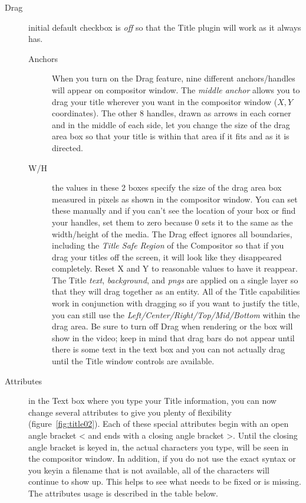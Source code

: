 \begin{description}
    \item[Drag] initial default checkbox is \textit{off} so that the Title plugin will work as it always has.
    \begin{description}
        \item[Anchors] When you turn on the Drag feature, nine different anchors/handles will appear on compositor window. The \textit{middle anchor} allows you to drag your title wherever you want in the compositor window ($X, Y$ coordinates). The other 8 handles, drawn as arrows in each corner and in the middle of each side, let you change the size of the drag area box so that your title is within that area if it fits and as it is directed.
        \item[W/H] the values in these 2 boxes specify the size of the drag area box measured in pixels as shown in the compositor window. You can set these manually and if you can't see the location of your box or find your handles, set them to zero because $0$ sets it to the same as the width/height of the media.
        The Drag effect ignores all boundaries, including the \textit{Title Safe Region} of the Compositor so that if you drag your titles off the screen, it will look like they disappeared completely. Reset X and Y to reasonable values to have it reappear. The Title \textit{text}, \textit{background}, and \textit{pngs} are applied on a single layer so that they will drag together as an entity. All of the Title capabilities work in conjunction with dragging so if you want to justify the title, you can still use the \textit{Left/Center/Right/Top/Mid/Bottom} within the drag area. Be sure to turn off Drag when rendering or the box will show in the video; keep in mind that drag bars do not appear until there is some text in the text box and you can not actually drag until the Title window controls are available.
    \end{description}
    \item[Attributes] in the Text box where you type your Title information, you can now change several attributes to give you plenty of flexibility (figure~\ref{fig:title02}). Each of these special attributes begin with an open angle bracket < and ends with a closing angle bracket >. Until the closing angle bracket is keyed in, the actual characters you type, will be seen in the compositor window. In addition, if you do not use the exact syntax or you keyin a filename that is not available, all of the characters will continue to show up. This helps to see what needs to be fixed or is missing. The attributes usage is described in the table below.
\end{description}

